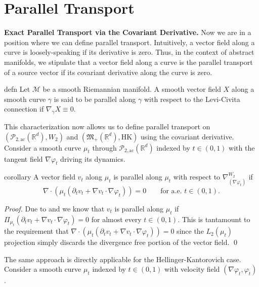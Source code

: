 \documentclass{article}
\newcommand{\man}{\mathcal{M}}
\newcommand{\pac}{\mathcal{P}_{2, \text{ac}}(\mathbb{R}^d)}
\newcommand{\posm}{\mathfrak{M}_+(\mathbb{R}^d)}
\begin{document}
\section{Parallel Transport}

\textbf{Exact Parallel Transport via the Covariant Derivative.} Now we are in a position where we can define parallel transport. Intuitively, a vector field along a curve is  loosely-speaking if its derivative is zero. Thus, in the context of abstract manifolds, we stipulate that a vector field along a curve is the parallel transport of a source vector if its covariant derivative along the curve is zero.
\begin{restatable}{defn}{} \label{parallel transport on general manifolds}
    Let $\man$ be a smooth Riemannian manifold. A smooth vector field $X$ along a smooth curve $\gamma$ is said to be parallel along $\gamma$ with respect to the Levi-Civita connection if $\nabla_{\dot \gamma}X \equiv 0$.
\end{restatable}
This characterization now allows us to define parallel transport on $(\pac, W_2)$ and $(\posm, \text{HK})$ using the covariant derivative. Consider a smooth curve $\mu_t$ through $\pac$ indexed by $t \in (0, 1)$ with the tangent field $\nabla \varphi_t$ driving its dynamics. 

\begin{restatable}{corollary}{} \label{Wasserstein parallel transport pde}
    A vector field $v_t$ along $\mu_t$ is parallel along $\mu_t$ with respect to $\nabla_{(\nabla\varphi_t)}^{W_2}$ if
    \begin{equation*}
        \boxed{\nabla \cdot \left(\mu_t\left(\partial_t v_t + \nabla v_t \cdot \nabla \varphi_t\right)\right) = 0 \qquad \text{for a.e. $t \in (0,1).$}}
    \end{equation*}
\end{restatable}
\noindent \textit{Proof.} Due to  and  we know that $v_t$ is parallel along $\mu_t$ if $\Pi_{\mu_t}\left(\partial_tv_t + \nabla v_t \cdot \nabla\varphi_t\right) = 0$ for almost every $t \in (0,1).$ This is tantamount to the requirement that $\nabla \cdot \left(\mu_t(\partial_tv_t + \nabla v_t \cdot \nabla\varphi_t)\right) = 0$ since the $L_2(\mu_t)$ projection simply discards the divergence free portion of the vector field. \qed{}

The same approach is directly applicable for the Hellinger-Kantorovich case. Consider a smooth curve $\mu_t$ indexed by $t \in (0,1)$ with velocity field $(\nabla\varphi_t, \varphi_t)$. 
\end{document}
